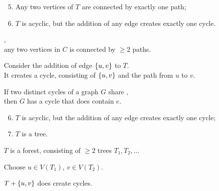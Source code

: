 \begin{frame}{}
  \begin{theorem}
    \begin{enumerate}[(1)]
      \setcounter{enumi}{4}
      \setlength{\itemsep}{6pt}
      \item Any two vertices of $T$ are connected by exactly one path;
      \item $T$ is acyclic, but the addition of any edge creates exactly one cycle.
    \end{enumerate}
  \end{theorem}

  \pause
  \vspace{0.30cm}
  \begin{center}
    , \\[3pt]
    any two vertices in $C$ is connected by $\ge 2$ paths.

    \pause
    \vspace{0.60cm}
    Consider the addition of edge $\{u, v\}$ to $T$. \\[3pt]
    It creates a cycle, consisting of $\{u, v\}$ and the path from $u$ to $v$.

    \pause
    \begin{lemma}
      If two distinct cycles of a graph $G$ share , \\[3pt]
      then $G$ has a cycle that does  contain $e$.
    \end{lemma}
  \end{center}
\end{frame}

\begin{frame}{}
  \begin{theorem}
    \begin{enumerate}[(1)]
      \setcounter{enumi}{5}
      \setlength{\itemsep}{6pt}
      \item $T$ is acyclic, but the addition of any edge creates exactly one cycle;
      \setcounter{enumi}{0}
      \item $T$ is a tree.
    \end{enumerate}
  \end{theorem}

  \pause
  \vspace{0.30cm}
  \begin{center}

    \pause
    \vspace{0.60cm}
    $T$ is a forest, consisting of $\ge 2$ trees $T_{1}, T_{2}, \dots$

    \pause
    \vspace{0.30cm}
    Choose $u \in V(T_{1})$, $v \in V(T_{2})$.

    \vspace{0.30cm}
    $T + \{u, v\}$ does  create cycles.
  \end{center}
\end{frame}
